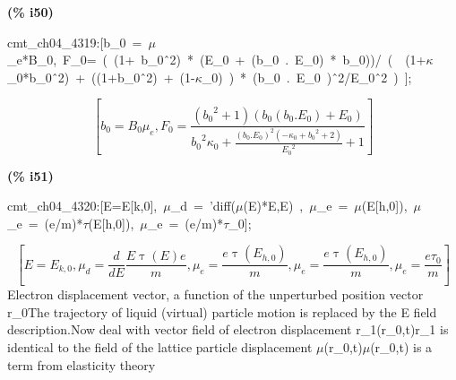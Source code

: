 \documentclass[fleqn]{article}
\begin{document}
\noindent
\begin{minipage}[t]{4.000000em}\color{red}\bfseries
(\% i50)	
\end{minipage}
\begin{minipage}[t]{\textwidth}\color{blue}
cmt\_ch04\_4319:[b\_0\ =\ \ensuremath{\mu}\_e*B\_0,\ F\_0=\ (\ (1+\ b\_0\^\ 2)\ *\ (E\_0\ +\ (b\_0\ .\ E\_0)\ *\ b\_0))/\ (\ \ (1+\ensuremath{\kappa}\_0*b\_0\^\ 2)\ +\ ((1+b\_0\^\ 2)\ +\ (1-\ensuremath{\kappa}\_0)\ )\ *\ (b\_0\ .\ E\_0\ )\^\ 2/E\_0\^\ 2\ )\ ];
\end{minipage}
\[\displaystyle \tag{\% o50} 
\left[ {b_0}={B_0} {{\mu }_e}\operatorname{,}{F_0}=\frac{\left( {{{b_0}}^{2}}+1\right)  \left( {b_0} \left( {b_0}\ensuremath{\mathrm{ . }}{E_0}\right) +{E_0}\right) }{{{{b_0}}^{2}} {{\kappa }_0}+\frac{{{\left( {b_0}\ensuremath{\mathrm{ . }}{E_0}\right) }^{2}} \left( -{{\kappa }_0}+{{{b_0}}^{2}}+2\right) }{{{{E_0}}^{2}}}+1}\right] \mbox{}
\]


\noindent
\begin{minipage}[t]{4.000000em}\color{red}\bfseries
(\% i51)	
\end{minipage}
\begin{minipage}[t]{\textwidth}\color{blue}
cmt\_ch04\_4320:[E=E[k,0],\ \ensuremath{\mu}\_d\ =\ 'diff(\ensuremath{\mu}(E)*E,E)\ ,\ \ensuremath{\mu}\_e\ =\ \ensuremath{\mu}(E[h,0]),\ \ensuremath{\mu}\_e\ =\ (e/m)*\ensuremath{\tau}(E[h,0]),\ \ensuremath{\mu}\_e\ =\ (e/m)*\ensuremath{\tau}\_0];
\end{minipage}
\[\displaystyle \tag{\% o51} 
\left[ E={E_{k,0}}\operatorname{,}{{\mu }_d}=\frac{d}{d E} \frac{E \operatorname{\tau }(E) e}{m}\operatorname{,}{{\mu }_e}=\frac{e \operatorname{\tau }\left( {E_{h,0}}\right) }{m}\operatorname{,}{{\mu }_e}=\frac{e \operatorname{\tau }\left( {E_{h,0}}\right) }{m}\operatorname{,}{{\mu }_e}=\frac{e {{\tau }_0}}{m}\right] \mbox{}
\]
Electron displacement vector, a function of the unperturbed position vector r\_0The trajectory of liquid (virtual) particle motion is replaced by the E field description.Now deal with vector field of electron displacement r\_1(r\_0,t)r\_1 is identical to the field of the lattice particle displacement \ensuremath{\mu}(r\_0,t)\ensuremath{\mu}(r\_0,t) is a term from elasticity theory
\end{document}
